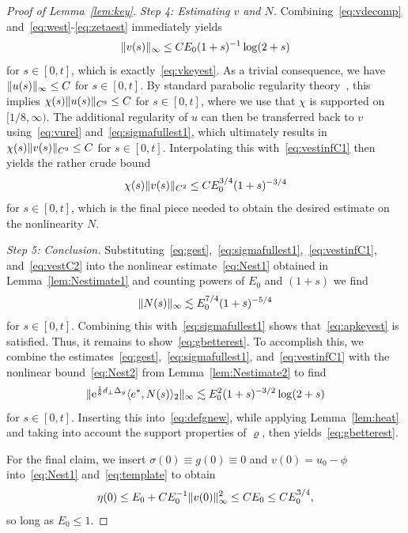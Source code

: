 \documentclass[12pt,oneside,a4paper,reqno]{amsart}
\numberwithin{equation}{section}
\theoremstyle{definition}
\theoremstyle{remark}
\newcommand{\re}{{\rm e}}
\DeclarePairedDelimiter{\norm}{\lVert}{\rVert}
\begin{document}
\begin{proof}[Proof of Lemma~\ref{lem:key}]
\emph{Step 4: Estimating $v$ and $N$.}
Combining~\eqref{eq:vdecomp} and~\eqref{eq:west}-\eqref{eq:zetaest} immediately yields
\begin{align}
    \label{eq:vestinfC1}
    \norm{v(s)}_{\infty} \leq C E_0 (1+s)^{-1}\log(2+s)
\end{align}
for $s \in [0,t]$, which is exactly~\eqref{eq:vkeyest}.
As a trivial consequence, we have $\norm{u(s)}_{\infty} \leq C$ for $s \in [0,t]$. By standard parabolic regularity theory~\cite{Lunardi_analytic_2013}, this implies $\smash{\chi(s)\norm{u(s)}_{C^9}} \leq C$ for $s \in [0,t]$, where we use that $\chi$ is supported on $[1/8,\infty)$.
The additional regularity of $u$ can then be transferred back to $v$ using~\eqref{eq:vurel} and~\eqref{eq:sigmafullest1}, which ultimately results in $\smash{\chi(s)\norm{v(s)}_{C^9}} \leq C$ for $s \in [0,t]$.
Interpolating this with~\eqref{eq:vestinfC1} then yields the rather crude bound
\begin{align}
    \label{eq:vestC2}
    \chi(s)\norm{v(s)}_{C^2} \leq C E_0^{3/4}(1+s)^{-3/4}
\end{align}
for $s \in [0,t]$, which is the final piece needed to obtain the desired estimate on the nonlinearity $N$.

\emph{Step 5: Conclusion.}
Substituting~\eqref{eq:gest},~\eqref{eq:sigmafullest1},~\eqref{eq:vestinfC1}, and~\eqref{eq:vestC2} into the nonlinear estimate~\eqref{eq:Nest1} obtained in Lemma~\ref{lem:Nestimate1} and counting powers of $E_0$ and $(1+s)$ we find
\begin{align*}
    \norm{N(s)}_{\infty} \lesssim E_0^{7/4}(1+s)^{-5/4}
\end{align*}
for $s \in [0,t]$. Combining this with~\eqref{eq:sigmafullest1} shows that~\eqref{eq:apkeyest} is satisfied.
Thus, it remains to show~\eqref{eq:gbetterest}.
To accomplish this, we combine the estimates~\eqref{eq:gest},~\eqref{eq:sigmafullest1}, and~\eqref{eq:vestinfC1} with the nonlinear bound~\eqref{eq:Nest2} from Lemma~\ref{lem:Nestimate2} to find
\begin{equation*}
    \norm{\re^{\frac{1}{8}d_{\bot}\Delta_y} \langle e^*,N(s)\rangle_2}_{\infty} \lesssim E_0^2 (1+s)^{-3/2} \log(2+s)
\end{equation*}
for $s \in [0,t]$. 
Inserting this into~\eqref{eq:defgnew}, while applying Lemma~\ref{lem:heat} and taking into account the support properties of $\varrho$, then yields~\eqref{eq:gbetterest}.

For the final claim, we insert $\sigma(0) \equiv g(0) \equiv 0$ and $v(0) = u_0 - \phi$ into~\eqref{eq:Nest1} and~\eqref{eq:template} to obtain
\begin{equation} \label{eq:eta0est}
\eta(0) \leq E_0 + C E_0^{-1}\norm{v(0)}^2_{\infty} \leq C E_0 \leq C E_0^{3/4},
\end{equation}
so long as $E_0 \leq 1$.


\end{proof}
\end{document}
